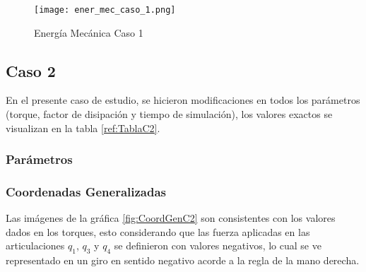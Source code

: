     \begin{figure} [H]%
            \centering
            \texttt{[image: ener\_mec\_caso\_1.png]} 
        \caption{Energía Mecánica Caso 1}
        \label{fig:eMecC1}
    \end{figure}

\subsection{Caso 2}\label{caso2}
    En el presente caso de estudio, se hicieron modificaciones en todos los 
    parámetros (torque, factor de disipación y tiempo de simulación), los 
    valores exactos se visualizan en la tabla \ref{ref:TablaC2}.

    \subsubsection{Parámetros} 
    \begin{table}[H]%
        \centering
        \begin{center}
        \caption{Parámetros modificados del simulador (Sistema No Conservativo)} 
        \centering
        \bigskip
        \end{center}
        \label{ref:TablaC2}
    \end{table}

    \subsubsection{Coordenadas Generalizadas}
    Las imágenes de la gráfica \ref{fig:CoordGenC2} son consistentes con los 
    valores dados en los torques, esto considerando que las fuerza aplicadas en las 
    articulaciones $q_1$, $q_3$ y $q_4$ se definieron con valores negativos,
    lo cual se ve representado en un giro en sentido negativo acorde a la regla 
    de la mano derecha.

